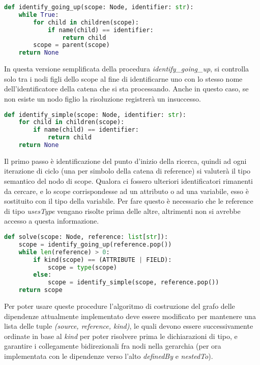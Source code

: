 \begin{lstlisting}[caption="Pseudocodice della procedura di ricerca senza limite superiore", language=Python]
def identify_going_up(scope: Node, identifier: str):
    while True:
        for child in children(scope):
            if name(child) == identifier:
                return child
        scope = parent(scope)
    return None
\end{lstlisting}

In questa versione semplificata della procedura \emph{identify_going_up}, si controlla solo tra i nodi figli dello scope al fine di identificarne uno con lo stesso nome dell'identificatore della catena che si sta processando. Anche in questo caso, se non esiste un nodo figlio la risoluzione registrer\`a un insuccesso.

\begin{lstlisting}[caption="Pseudocodice della procedura di ricerca con scope", language=Python]
def identify_simple(scope: Node, identifier: str):
    for child in children(scope):
        if name(child) == identifier:
            return child
    return None
\end{lstlisting}

Il primo passo \`e identificazione del punto d'inizio della ricerca, quindi ad ogni iterazione di ciclo (una per simbolo della catena di reference) si valuter\`a il tipo semantico del nodo di scope. Qualora ci fossero ulteriori identificatori rimanenti da cercare, e lo scope corrispondesse ad un attributo o ad una variabile, esso \`e sostituito con il tipo della variabile. Per fare questo \`e necessario che le reference di tipo \emph{usesType} vengano risolte prima delle altre, altrimenti non si avrebbe accesso a questa informazione.

\begin{lstlisting}[caption="Pseudocodice della procedura di risoluzione delle reference", language=Python]
def solve(scope: Node, reference: list[str]):
    scope = identify_going_up(reference.pop())
    while len(reference) > 0:
        if kind(scope) == (ATTRIBUTE | FIELD):
            scope = type(scope)
        else:
            scope = identify_simple(scope, reference.pop())
    return scope
\end{lstlisting}

Per poter usare queste procedure l'algoritmo di costruzione del grafo delle dipendenze attualmente implementato deve essere modificato per mantenere una lista delle tuple \emph{(source, reference, kind)}, le quali devono essere successivamente ordinate in base al \emph{kind} per poter risolvere prima le dichiarazioni di tipo, e garantire i collegamente bidirezionali fra nodi nella gerarchia (per ora implementata con le dipendenze verso l'alto \emph{definedBy} e \emph{nestedTo}).
